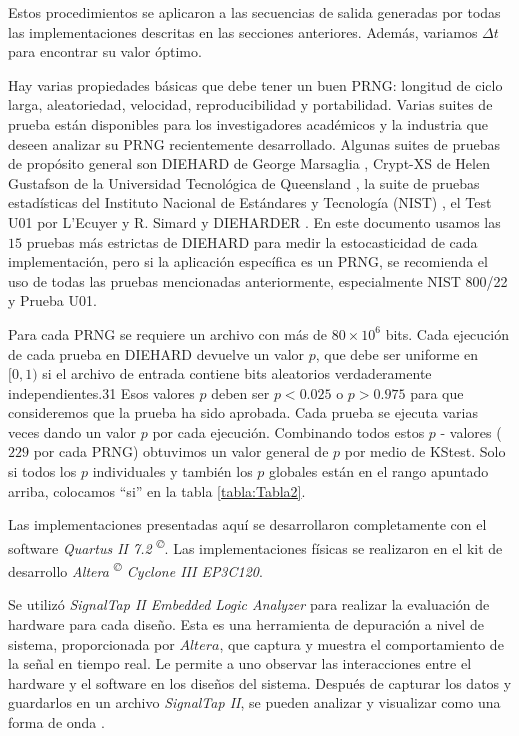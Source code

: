 Estos procedimientos se aplicaron a las secuencias de salida generadas por todas las implementaciones descritas en las secciones anteriores.
Además, variamos $\Delta t$ para encontrar su valor óptimo.

Hay varias propiedades básicas que debe tener un buen PRNG: longitud de ciclo larga, aleatoriedad, velocidad, reproducibilidad y portabilidad.
Varias suites de prueba \cite{Soto} están disponibles para los investigadores académicos y la industria que deseen analizar su PRNG recientemente desarrollado.
Algunas suites de pruebas de propósito general son DIEHARD de George Marsaglia \cite{Marsaglia1995}, Crypt-XS de Helen Gustafson de la Universidad Tecnológica de Queensland \cite{Gustafson1994}, la suite de pruebas estadísticas del Instituto Nacional de Estándares y Tecnología (NIST) \cite{Rukhin2000}, el Test U01 por L'Ecuyer y R. Simard \cite{Lecuyer2007} y DIEHARDER \cite{Brown2012}.
En este documento usamos las $15$ pruebas más estrictas de DIEHARD \cite{Marsaglia1995} para medir la estocasticidad de cada implementación, pero si la aplicación específica es un PRNG, se recomienda el uso de todas las pruebas mencionadas anteriormente, especialmente NIST 800/22 y Prueba U01.

Para cada PRNG se requiere un archivo con más de $80 \times 10^6$ bits.
Cada ejecución de cada prueba en DIEHARD devuelve un valor $p$, que debe ser uniforme en $[0,1)$ si el archivo de entrada contiene bits aleatorios verdaderamente independientes.31
Esos valores $p$ deben ser $p < 0.025$ o $p > 0.975$ para que consideremos que la prueba ha sido aprobada.
Cada prueba se ejecuta varias veces dando un valor $p$ por cada ejecución.
Combinando todos estos $p$ - valores ($229$ por cada PRNG) obtuvimos un valor general de $p$ por medio de KStest.
Solo si todos los $p$ individuales y también los $p$ globales están en el rango apuntado arriba, colocamos ``si'' en la tabla \ref{tabla:Tabla2}.

Las implementaciones presentadas aquí se desarrollaron completamente con el software \textit{Quartus II  7.2 \textsuperscript{\copyright}}.
Las implementaciones físicas se realizaron en el kit de desarrollo \textit{Altera \textsuperscript{\copyright} Cyclone III EP3C120}.

Se utilizó  \textit{SignalTap II Embedded Logic Analyzer} para realizar la evaluación de hardware para cada diseño.
Esta es una herramienta de depuración a nivel de sistema, proporcionada por $Altera$, que captura y muestra el comportamiento de la señal en tiempo real.
Le permite a uno observar las interacciones entre el hardware y el software en los diseños del sistema.
Después de capturar los datos y guardarlos en un archivo \textit{SignalTap II}, se pueden analizar y visualizar como una forma de onda \cite{QUARTUS}.

